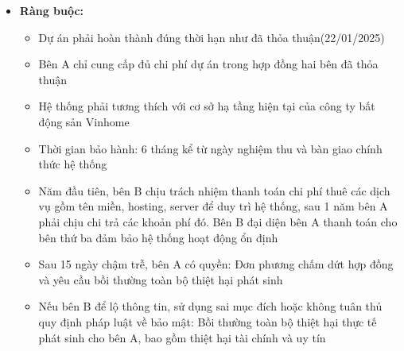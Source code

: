 {\begin{minipage}{\textwidth}
\begin{itemize}
\begin{itemize}
            \item Các công cụ, phần mềm và cơ sở hạ tầng kỹ thuật cần thiết để phát triển hệ thống đều sẵn có và hoạt động ổn định
            \item Nhân sự từ hai bên (A và B) hợp tác chặt chẽ và đảm bảo tiến độ triển khai dự án
        \end{itemize}
        \item \textbf{Ràng buộc:}
        \begin{itemize}
            \item Dự án phải hoàn thành đúng thời hạn như đã thỏa thuận(22/01/2025)
            \item Bên A chỉ cung cấp đủ chi phí dự án trong hợp đồng hai bên đã thỏa thuận
            \item Hệ thống phải tương thích với cơ sở hạ tầng hiện tại của công ty bất động sản Vinhome
            \item Thời gian bảo hành: 6 tháng kể từ ngày nghiệm thu và bàn giao chính thức hệ thống
            \item Năm đầu tiên, bên B chịu trách nhiệm thanh toán chi phí thuê các dịch vụ gồm tên miền, hosting, server để duy trì hệ thống, sau 1 năm bên A phải chịu chi trả các khoản phí đó. Bên B đại diện bên A thanh toán cho bên thứ ba đảm bảo hệ thống hoạt động ổn định
            \item Sau 15 ngày chậm trễ, bên A có quyền: Đơn phương chấm dứt hợp đồng và yêu cầu bồi thường toàn bộ thiệt hại phát sinh
            \item Nếu bên B để lộ thông tin, sử dụng sai mục đích hoặc không tuân thủ quy định pháp luật về bảo mật: Bồi thường toàn bộ thiệt hại thực tế phát sinh cho bên A, bao gồm thiệt hại tài chính và uy tín
        \end{itemize}
    \end{itemize}
\end{minipage}
}
